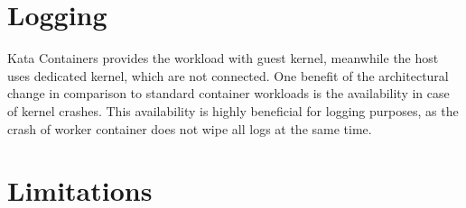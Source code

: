 \section{Logging}

Kata Containers provides the workload with guest kernel, meanwhile the host uses dedicated kernel, which are not connected. One benefit of the architectural change in comparison to standard container workloads is the availability in case of kernel crashes. This availability is highly beneficial for logging purposes, as the crash of worker container does not wipe all logs at the same time.

\section{Limitations}